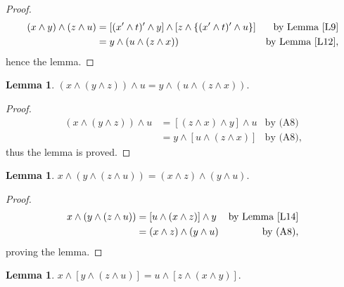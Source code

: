 \documentclass{amsart}
\theoremstyle{plain}
\newtheorem{lemma}[theorem]{Lemma}
\theoremstyle{problem}
\theoremstyle{definition}
\theoremstyle{remark}
\numberwithin{equation}{section}
\begin{document}
\begin{proof}
\begin{align*}
 (x \land y) \land (z \land u) &= [(x' \land t)' \land y] \land [z \land \{(x' \land t)' \land u\}] &\text{by Lemma \ref{L9}}\\ %
                                                 &= y \land (u \land (z \land x)) &\text{by Lemma \ref{L12}}, %
\end{align*}
hence the lemma.
\end{proof}

\begin{lemma} \label{L14}  %
$(x \land (y \land z)) \land u = y \land (u \land (z \land x)). $  
\end{lemma}

\begin{proof}
\begin{align*}
(x \land (y \land z)) \land u &= [(z \land x) \land y] \land u &\text{by (A8)} \\
                                           &= y \land [u \land (z \land x)]  &\text{by (A8)},
\end{align*}
thus the lemma is proved.
\end{proof}


\begin{lemma} \label{L15} 
 $x \land (y \land (z \land u)) = (x \land z) \land (y \land u). $ 
\end{lemma}

\begin{proof}
\begin{align*}
x \land (y \land (z \land u)) &= [u \land (x \land z)] \land y &\text{by Lemma \ref{L14}}\\ 
                                            &= (x \land z) \land (y \land u) &\text{by (A8)},
\end{align*}
proving the lemma.
\end{proof}

\begin{lemma} \label{L16} 
 $x \land [y \land (z \land u)] = u \land [z \land (x \land y)].$ 
\end{lemma}
\end{document}
